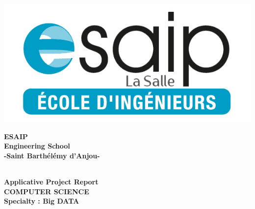 \begin{titlepage}
\begin{center}
	\begin{minipage}{5cm}
	\begin{center}
		\includegraphics[scale=0.18]{img/esaip_logo.png}
	\end{center}
\end{minipage}\hfill
\begin{minipage}{10cm}
	\begin{center}
	\textbf{ESAIP}\\[0.1cm]
    \textbf{Engineering School}\\[0.1cm]
    \textbf{-Saint Barth\'el\'emy d'Anjou-}
	\end{center}
\end{minipage}\hfill

\textsc{\Large }\\[1.5cm]
{\large \bfseries Applicative Project Report}\\[0.5cm]

{\huge \bfseries \uppercase{Computer Science} \\[0.5cm] }
{\large \bfseries Specialty : Big DATA}
\textsc{\Large }\\[1cm]


\end{center}
\end{titlepage}
